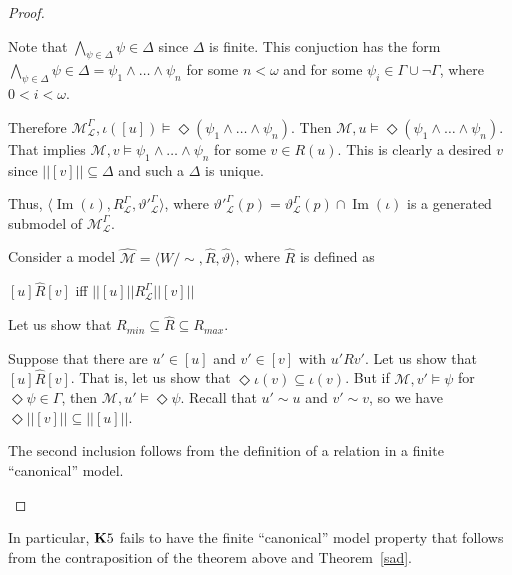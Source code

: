 \documentclass[a4paper]{article}
\theoremstyle{defin}
\theoremstyle{theorem}
\theoremstyle{prop}
\theoremstyle{lemma}
\theoremstyle{fact}
\theoremstyle{ex}
\theoremstyle{col}
\begin{document}
\begin{proof}
\begin{enumerate}
    Note that $\bigwedge \limits_{\psi \in \Delta} \psi \in \Delta$ since $\Delta$ is finite.
    This conjuction has the form $\bigwedge \limits_{\psi \in \Delta} \psi \in \Delta = \psi_1 \land \dots \land \psi_n$ for some $n < \omega$ and for some $\psi_i \in \Gamma \cup \neg \Gamma$, where $0 < i < \omega$.

    Therefore $\mathcal{M}^{\Gamma}_{\mathcal{L}}, \iota([u]) \models \Diamond (\psi_1 \land \dots \land \psi_n)$.
    Then $\mathcal{M}, u \models \Diamond (\psi_1 \land \dots \land \psi_n)$. That implies $\mathcal{M}, v \models \psi_1 \land \dots \land \psi_n$ for some $v \in R(u)$.
    This is clearly a desired $v$ since $||[v]|| \subseteq \Delta$ and such a $\Delta$ is unique.

    Thus, $\langle \operatorname{Im}(\iota), R_{\mathcal{L}}^{\Gamma}, {\vartheta'}_{\mathcal{L}}^{\Gamma} \rangle$, where ${\vartheta'}_{\mathcal{L}}^{\Gamma}(p) = \vartheta_{\mathcal{L}}^{\Gamma}(p) \cap \operatorname{Im}(\iota)$
    is a generated submodel of $\mathcal{M}_{\mathcal{L}}^{\Gamma}$.

    Consider a model $\widehat{\mathcal{M}} = \langle W/\sim, \widehat{R}, \widehat{\vartheta} \rangle$, where $\widehat{R}$ is defined as
    \begin{center}
      $[u] \widehat{R} [v]$ iff $||[u]|| {R}_{\mathcal{L}}^{\Gamma} ||[v]||$
    \end{center}

    Let us show that $R_{min} \subseteq \widehat{R} \subseteq R_{max}$.

    Suppose that there are $u' \in [u]$ and $v' \in [v]$ with $u' R v'$. Let us show that
    $[u] \widehat{R} [v]$. That is, let us show that $\Diamond \iota(v) \subseteq \iota(v)$.
    But if $\mathcal{M}, v' \models \psi$ for $\Diamond \psi \in \Gamma$, then
    $\mathcal{M}, u' \models \Diamond \psi$. Recall that $u' \sim u$ and $v' \sim v$, so we have $\Diamond ||[v]|| \subseteq ||[u]||$.

    The second inclusion follows from the definition of a relation in a finite ``canonical'' model.
  \end{enumerate}
\end{proof}

In particular, ${\bf K}5$ fails to have the finite ``canonical'' model property that
follows from the contraposition of the theorem above and Theorem~\ref{sad}.



\end{document}
